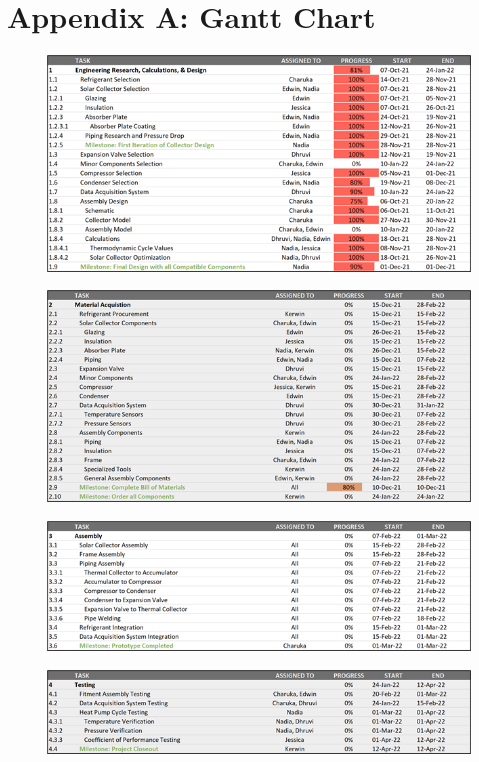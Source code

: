 \chapter{Appendix A: Gantt Chart}

\begin{figure}[H]
    \centering
    \includegraphics[width=15cm]{images/gantt1.png}
\end{figure}
\begin{figure}[H]
    \centering
    \includegraphics[width=15cm]{images/gantt2.png}
\end{figure}
\begin{figure}[H]
    \centering
    \includegraphics[width=15cm]{images/gantt3.png}
\end{figure}
\begin{figure}[H]
    \centering
    \includegraphics[width=15cm]{images/gantt4.png}
\end{figure}


